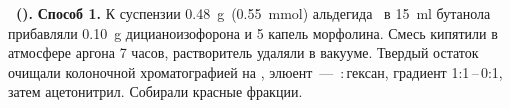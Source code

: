 
\textbf{~().} \textbf{Способ 1.} К суспензии \SI{0.48}{\gram}~(\SI{0.55}{\mmol}) альдегида~\textbf{} в \SI{15}{\milli\litre} бутанола прибавляли \SI{0.10}{\gram} дицианоизофорона и 5 капель морфолина. Смесь кипятили в атмосфере аргона 7 часов, растворитель удаляли в вакууме. Твердый остаток очищали колоночной хроматографией на , элюент~--- \,:\,гексан, градиент 1:1\,--\,0:1, затем ацетонитрил. Собирали красные фракции. 


